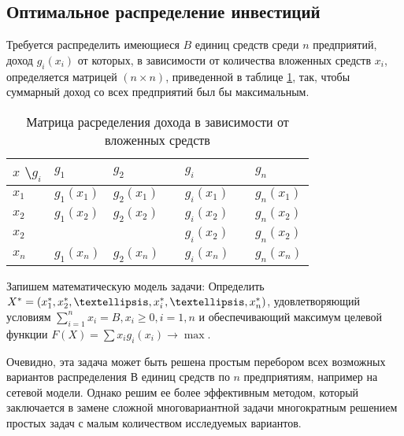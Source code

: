 \subsection{Оптимальное распределение инвестиций}

Требуется распределить имеющиеся $B$ единиц средств среди $n$ предприятий, доход $g_i(x_i)$ от которых, в зависимости от количества вложенных средств $x_i$, определяется матрицей $(n \times n)$, приведенной в таблице \ref{table:opt:initial:data}, так, чтобы суммарный доход со всех предприятий был бы максимальным.

\begin{table}[!ht]
	\caption{Матрица расределения дохода в зависимости от вложенных средств}
	\label{table:opt:initial:data}
  \centering
  \begin{tabularx}{\linewidth}{ |X|X|X|X|X|X|X| }
	\hline
	$x$ \textbackslash $g_i$ & $g_1$ & $g_2$ & \textellipsis & $g_i$ & \textellipsis & $g_n$ \\
	\hline
	$x_1$ & $g_1(x_1)$ & $g_2(x_1)$ & \textellipsis & $g_i(x_1)$ & \textellipsis & $g_n(x_1)$ \\
	\hline
	$x_2$ & $g_1(x_2)$ & $g_2(x_2)$ & \textellipsis & $g_i(x_2)$ & \textellipsis & $g_n(x_2)$ \\
	\hline
	$x_2$ & \textellipsis & \textellipsis & \textellipsis & $g_i(x_2)$ & \textellipsis & $g_n(x_2)$ \\
	\hline
	$x_n$ & $g_1(x_n)$ & $g_2(x_n)$ & \textellipsis & $g_i(x_n)$ & \textellipsis & $g_n(x_n)$ \\
	\hline
  \end{tabularx}
\end{table}

Запишем математическую модель задачи: Определить $X^* = (x^*_1,x^*_2,\textellipsis,x^*_i,\textellipsis,x^*_n)$, удовлетворяющий условиям $\sum_{i=1}^n x_i = B, x_i \geq 0, i = 1, n$ и обеспечивающий максимум целевой функции $F(X) = \sum x_i g_i (x_i) \rightarrow \max$.

Очевидно, эта задача может быть решена простым перебором всех возможных вариантов распределения $В$ единиц средств по $n$ предприятиям, например на сетевой модели. Однако решим ее более эффективным методом, который заключается в замене сложной многовариантной задачи многократным решением простых задач с малым количеством исследуемых вариантов.

